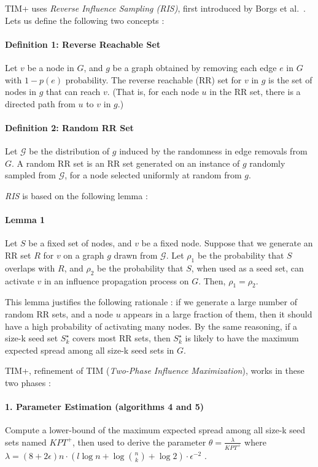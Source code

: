 \documentclass[a4paper,12pt]{article}
\begin{document}
TIM+ uses \emph{Reverse Influence Sampling (RIS)}, first introduced by Borgs et al.~\cite{borgs2014maximizing}. Lets us define the following two concepts :

\paragraph{Definition 1: Reverse Reachable Set}
Let $v$ be a node in $G$, and $g$ be a graph obtained by removing each edge $e$ in $G$ with $1 - p(e)$ probability. The reverse reachable (RR) set for $v$ in $g$ is the set of nodes in $g$ that can reach $v$. (That is, for each node $u$ in the RR set, there is a directed path from $u$ to $v$ in $g$.)

\paragraph{Definition 2: Random RR Set}
Let $\mathcal{G}$ be the distribution of $g$ induced by the randomness in edge removals from $G$. A random RR set is an RR set generated on an instance of $g$ randomly sampled from $\mathcal{G}$, for a node selected uniformly at random from $g$.

\emph{RIS} is based on the following lemma : 

\paragraph{Lemma 1}
Let $S$ be a fixed set of nodes, and $v$ be a fixed node.
Suppose that we generate an RR set $R$ for $v$ on a graph $g$ drawn from $\mathcal{G}$. Let $\rho_1$ be the probability that $S$ overlaps with $R$, and $\rho_2$ be the probability that $S$, when used as a seed set, can activate $v$ in an influence propagation process on $G$. Then, $\rho_1 = \rho_2$.

This lemma justifies the following rationale : if we generate a large number of random RR sets, and a node $u$ appears in a large fraction of them, then it should have a high probability of activating many nodes. By the same reasoning, if a size-k seed set
$S_k^{\star}$ covers most RR sets, then $S_k^{\star}$ is likely to have the maximum expected spread among all size-k seed sets in $G$.

TIM+, refinement of TIM (\emph{Two-Phase Influence Maximization}), works in these two phases :

\paragraph{1. Parameter Estimation (algorithms 4 and 5)}
Compute a lower-bound of the maximum expected spread among all size-k seed sets named $KPT^+$, then used to derive the parameter $\theta = \frac{\lambda}{KPT^+}$ where $\lambda = (8 + 2 \epsilon)n \cdot (l \log n + \log \binom{n}{k}+ \log 2) \cdot \epsilon^{-2}$ .
\end{document}
